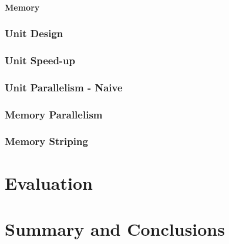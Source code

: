 \documentclass[a4paper,9pt]{report}
\begin{document}
\subsubsection{Memory}


\subsection{Unit Design} 


\subsection{Unit Speed-up}
\subsection{Unit Parallelism - Naive}
\subsection{Memory Parallelism}
\subsection{Memory Striping}

\chapter{Evaluation} 

\chapter{Summary and Conclusions} 


\appendix
\singlespacing

 
% 
\end{document}
